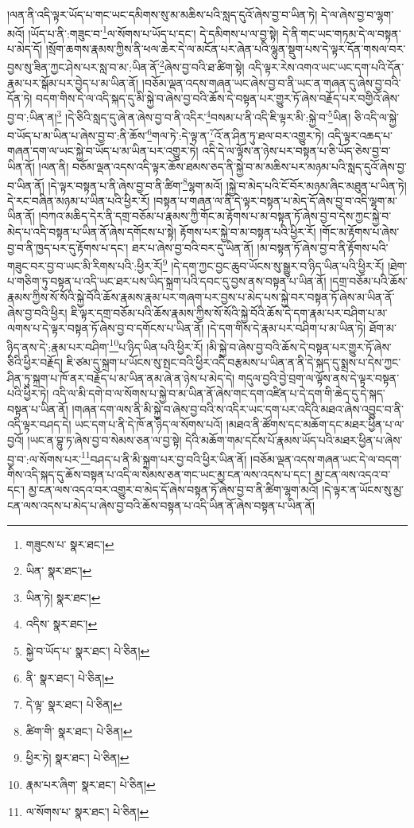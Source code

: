 །ལན་ནི་འདི་ལྟར་ཡོད་པ་གང་ཡང་དམིགས་སུ་མ་མཆིས་པའི་སླད་དུའོ་ཞེས་བྱ་བ་ཡིན་ཏེ། དེ་ལ་ཞེས་བྱ་བ་ལྷག་མའོ། །ཡོད་པ་ནི་:གཟུང་བ་\footnote{གཟུངས་པ་  སྣར་ཐང་། }ལ་སོགས་པ་ཡོད་པ་དང་། དེ་དམིགས་པ་ལ་བྱ་སྟེ། དེ་ནི་གང་ཡང་གཏམ་དེ་ལ་བསྟན་པ་མེད་དོ། །སྲོག་ཆགས་རྣམས་ཀྱིས་ནི་ཕལ་ཆེར་དེ་ལ་མངོན་པར་ཞེན་པའི་ལྷུན་སྡུག་པས་དེ་ལྟར་དོན་གསལ་བར་བྱས་སུ་ཟིན་ཀྱང་ཤེས་པར་སླ་བ་མ་:ཡིན་ནོ་\footnote{ཡིན་  སྣར་ཐང་། }ཞེས་བྱ་བའི་ཐ་ཚིག་སྟེ། འདི་ལྟར་རེས་འགའ་ཡང་ཡང་དག་པའི་དོན་རྣམ་པར་སྒོམ་པར་བྱེད་པ་མ་ཡིན་ནོ། །བཅོམ་ལྡན་འདས་གཞན་ཡང་ཞེས་བྱ་བ་ནི་ཡང་ན་གཞན་དུ་ཞེས་བྱ་བའི་དོན་ཏེ། བདག་གིས་དེ་ལ་འདི་སྐད་དུ་མི་སྐྱེ་བ་ཞེས་བྱ་བའི་ཆོས་དེ་བསྟན་པར་གྱུར་ཏོ་ཞེས་བརྗོད་པར་བགྱིའོ་ཞེས་བྱ་བ་:ཡིན་ན།\footnote{ཡིན་ཏེ།  སྣར་ཐང་། } །དེ་ཅིའི་སླད་དུ་ཞེ་ན་ཞེས་བྱ་བ་ནི་འདིར་\footnote{འདིས་  སྣར་ཐང་། }བསམ་པ་ནི་འདི་ཇི་ལྟར་མི་:སྐྱེ་བ་\footnote{སྐྱེ་བ་ཡོད་པ་  སྣར་ཐང་།  པེ་ཅིན། }ཡིན། ཅི་འདི་ལ་སྐྱེ་བ་ཡོད་པ་མ་ཡིན་པ་ཞེས་བྱ་བ་:ནི་ཆོས་\footnote{ནི་  སྣར་ཐང་།  པེ་ཅིན། }གལ་ཏེ་:དེ་ལྟ་ན་\footnote{དེ་ལྟ་  སྣར་ཐང་།  པེ་ཅིན། }འོ་ན་ཤིན་ཏུ་ཐལ་བར་འགྱུར་ཏེ། འདི་ལྟར་འཆད་པ་གཞན་དག་ལ་ཡང་སྐྱེ་བ་ཡོད་པ་མ་ཡིན་པར་འགྱུར་ཏེ། འདི་དེ་ལ་ལྟོས་ན་ཉེས་པར་བསྟན་པ་ཅི་ཡོད་ཅེས་བྱ་བ་ཡིན་ནོ། །ལན་ནི། བཅོམ་ལྡན་འདས་འདི་ལྟར་ཆོས་ཐམས་ཅད་ནི་སྐྱེ་བ་མ་མཆིས་པར་མཉམ་པའི་སླད་དུའོ་ཞེས་བྱ་བ་ཡིན་ནོ། །དེ་ལྟར་བསྟན་པ་ནི་ཞེས་བྱ་བ་ནི་ཚིག་\footnote{ཚིག་གི་  སྣར་ཐང་།  པེ་ཅིན། }ལྷག་མའོ། །སྐྱེ་བ་མེད་པའི་ངོ་བོར་མཉམ་ཞིང་མཐུན་པ་ཡིན་ཏེ། དེ་རང་བཞིན་མཉམ་པ་ཡིན་པའི་ཕྱིར་རོ། །བསྟན་པ་གཞན་ལ་ནི་དེ་ལྟར་བསྟན་པ་མེད་དོ་ཞེས་བྱ་བ་འདི་ལྷག་མ་ཡིན་ནོ། །བཀའ་མཆིད་དེར་ནི་དགྲ་བཅོམ་པ་རྣམས་ཀྱི་གོང་མ་རྟོགས་པ་མ་བསྟན་ཏོ་ཞེས་བྱ་བ་དེས་ཀྱང་སྐྱེ་བ་མེད་པ་འདི་བསྟན་པ་ཡིན་ནོ་ཞེས་དགོངས་པ་སྟེ། རྟོགས་པར་སྐྱེ་བ་མ་བསྟན་པའི་ཕྱིར་རོ། །གོང་མ་རྟོགས་པ་ཞེས་བྱ་བ་ནི་ཁྱད་པར་དུ་རྟོགས་པ་དང་། ཐར་པ་ཞེས་བྱ་བའི་བར་དུ་ཡིན་ནོ། །མ་བསྟན་ཏོ་ཞེས་བྱ་བ་ནི་རྟོགས་པའི་གཟུང་བར་བྱ་བ་ཡང་མི་རིགས་པའི་:ཕྱིར་རོ།\footnote{ཕྱིར་ཏེ།  སྣར་ཐང་།  པེ་ཅིན། } །དེ་དག་ཀྱང་བྱང་ཆུབ་ཡོངས་སུ་སྒྱུར་བ་ཉིད་ཡིན་པའི་ཕྱིར་རོ། །ཐེག་པ་གཅིག་ཏུ་བསྟན་པ་འདི་ཡང་ཐར་པས་ཡིད་སྐྲག་པའི་དབང་དུ་བྱས་ནས་བསྟན་པ་ཡིན་ནོ། །དགྲ་བཅོམ་པའི་ཆོས་རྣམས་ཀྱིས་སོ་སོའི་སྐྱེ་བོའི་ཆོས་རྣམས་རྣམ་པར་གཞག་པར་བྱས་པ་མེད་པས་སྐྱེ་བར་བསྟན་ཏོ་ཞེས་མ་ཡིན་ནོ་ཞེས་བྱ་བའི་ཕྱིར། ཇི་ལྟར་དགྲ་བཅོམ་པའི་ཆོས་རྣམས་ཀྱིས་སོ་སོའི་སྐྱེ་བོའི་ཆོས་དེ་དག་རྣམ་པར་བཤིག་པ་མ་ལགས་པ་དེ་ལྟར་བསྟན་ཏོ་ཞེས་བྱ་བ་དགོངས་པ་ཡིན་ནོ། །དེ་དག་གིས་དེ་རྣམ་པར་བཤིག་པ་མ་ཡིན་ཏེ། ཐོག་མ་ཉིད་ནས་དེ་:རྣམ་པར་བཤིག་\footnote{རྣམ་པར་ཞིག་  སྣར་ཐང་།  པེ་ཅིན། }པ་ཉིད་ཡིན་པའི་ཕྱིར་རོ། །མི་སྐྱེ་བ་ཞེས་བྱ་བའི་ཆོས་དེ་བསྟན་པར་གྱུར་ཏོ་ཞེས་ཅིའི་ཕྱིར་བརྗོད། ཇི་ཙམ་དུ་སྐྲག་པ་ཡོངས་སུ་སྤང་བའི་ཕྱིར་འདི་བརྩམས་པ་ཡིན་ན་ནི་དེ་སྐད་དུ་སྨྲས་པ་དེས་ཀྱང་ཤིན་ཏུ་སྐྲག་པ་ཁོ་ནར་བརྗོད་པ་མ་ཡིན་ནམ་ཞེ་ན་ཉེས་པ་མེད་དེ། གདུལ་བྱའི་བྱེ་བྲག་ལ་ལྟོས་ནས་དེ་ལྟར་བསྟན་པའི་ཕྱིར་ཏེ། འདི་ལ་མི་དགེ་བ་ལ་སོགས་པ་སྐྱེ་བ་མ་ཡིན་ནོ་ཞེས་གང་དག་འཛིན་པ་དེ་དག་གི་ཆེད་དུ་དེ་སྐད་བསྟན་པ་ཡིན་ནོ། །གཞན་དག་ལས་ནི་མི་སྐྱེ་བ་ཞེས་བྱ་བའི་ས་འདིར་ཡང་དག་པར་འདིའི་མཐའ་ཞེས་འབྱུང་བ་ནི་འདི་ལྟར་བཤད་དེ། ཡང་དག་པ་ནི་དེ་ཁོ་ན་ཉིད་ལ་སོགས་པའོ། །མཐའ་ནི་ཚོགས་དང་མཆོག་དང་མཐར་ཕྱིན་པ་ལ་བྱའོ། །ཡང་ན་བྷུ་ཏ་ཞེས་བྱ་བ་སེམས་ཅན་ལ་བྱ་སྟེ། དེའི་མཆོག་གམ་དངོས་པོ་རྣམས་ཡོད་པའི་མཐར་ཕྱིན་པ་ཞེས་བྱ་བ་:ལ་སོགས་པར་\footnote{ལ་སོགས་པ་  སྣར་ཐང་།  པེ་ཅིན། }བཤད་པ་ནི་མི་སྐྲག་པར་བྱ་བའི་ཕྱིར་ཡིན་ནོ། །བཅོམ་ལྡན་འདས་གཞན་ཡང་དེ་ལ་བདག་གིས་འདི་སྐད་དུ་ཆོས་བསྟན་པ་འདི་ལ་སེམས་ཅན་གང་ཡང་མྱ་ངན་ལས་འདས་པ་དང་། མྱ་ངན་ལས་འདའ་བ་དང་། མྱ་ངན་ལས་འདའ་བར་འགྱུར་བ་མེད་དོ་ཞེས་བསྟན་ཏོ་ཞེས་བྱ་བ་ནི་ཚིག་ལྷག་མའོ། །དེ་ལྟར་ན་ཡོངས་སུ་མྱ་ངན་ལས་འདས་པ་མེད་པ་ཞེས་བྱ་བའི་ཆོས་བསྟན་པ་འདི་ཡིན་ནོ་ཞེས་བསྟན་པ་ཡིན་ནོ། 